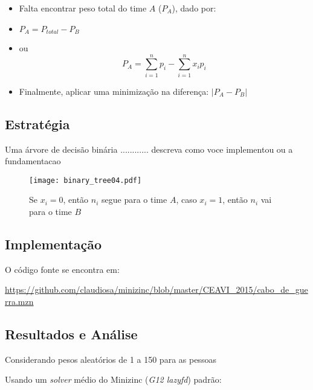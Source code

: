 
  \begin{itemize}
  \item Falta encontrar peso total do time $A$ ($P_A$), dado por: 

  \item $P_A = P_{total} - P_B$
  
  \item  ou $$P_A = \sum_{i=1}^n p_i - \sum_{i=1}^n x_i p_i$$   

  \item Finalmente, aplicar uma minimização  na diferença: $|P_A - P_B|$
  
  
  \end{itemize}

\subsection{Estratégia}%

Uma árvore de decisão binária ............ descreva como
voce implementou ou a fundamentacao

\begin{figure}[ht!]
 \centering
 \texttt{[image: binary\_tree04.pdf]}
\caption{Se $x_i=0$, então $n_i$ segue para o time $A$, caso  $x_i=1$, então  $n_i$ vai para o time $B$} 
\end{figure}

\subsection{Implementação}

O código fonte se encontra em:

\url{https://github.com/claudiosa/minizinc/blob/master/CEAVI_2015/cabo_de_guerra.mzn}

\subsection{Resultados e Análise}


Considerando pesos aleatórios de 1 a 150 para as pessoas

Usando um \textit{solver} médio do Minizinc (\textit{G12 lazyfd}) padrão:

